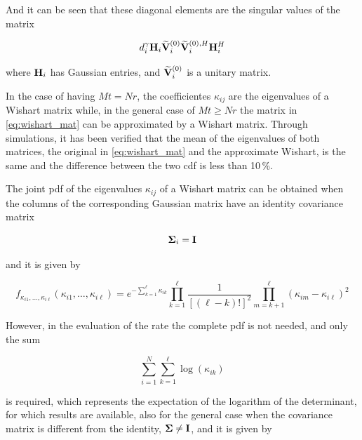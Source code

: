 And it can be seen that these diagonal elements are the singular values of the
matrix

\begin{equation} \label{eq:wishart_mat}
    d_{i}^{\gamma}\mathbf{H}_i\mathbf{\widetilde{V}}_i^{(0)} \mathbf{\widetilde{V}}_i^{(0),H} \mathbf{H}_i^H
\end{equation}

\noindent
where $\mathbf{H}_i$ has Gaussian entries, and $\mathbf{\widetilde{V}}_i^{(0)}$ is a unitary matrix.

In the case of having $Mt = Nr$, the coefficientes $\kappa_{ij}$ are the
eigenvalues of a Wishart matrix while, in the general case of $Mt \geq Nr$ the
matrix in \eqref{eq:wishart_mat} can be approximated by a Wishart matrix.
Through simulations, it has been verified that the mean of the eigenvalues of 
both matrices, the original in \eqref{eq:wishart_mat} and the approximate
Wishart, is the same and the difference between the two \gls{cdf} is less than 10\,\%.

The joint \gls{pdf} of the eigenvalues $\kappa_{ij}$ of a Wishart matrix can be
obtained when the columns of the corresponding Gaussian matrix have an identity
covariance matrix

\begin{equation} \label{eq:cov_identity}
    \mathbf{\Sigma}_i = \mathbf{I}
\end{equation}

\noindent
and it is given by \cite{tulino04}

\begin{equation} \label{eq:joint_pdf_eigenv_eye_cov}
    f_{\kappa_{i1}, \ldots, \kappa_{i\ell}}\left(\kappa_{i1}, \ldots,
    \kappa_{i\ell}\right) = e^{-\sum_{k=1}^{\ell}\kappa_{ik}}\prod_{k=1}^{\ell}
    \frac{1}{\left[\left(\ell - k\right)!\right]^2} \prod_{m = k + 1}^{\ell}
    \left(\kappa_{im} - \kappa_{i\ell}\right)^2
\end{equation}

However, in the evaluation of the rate the complete \gls{pdf} is not needed, and
only the sum

\begin{equation} \label{eq:sum_kappa}
    \sum_{i = 1}^{N}\sum_{k = 1}^{\ell} \log \left( \kappa_{ik} \right)
\end{equation}

\noindent
is required, which represents the expectation of the logarithm of the
determinant, for which results are available, also for the general case when the
covariance matrix is different from the identity, $\mathbf{\Sigma} \neq \mathbf{I}$,
and it is given by \cite{tulino04}

